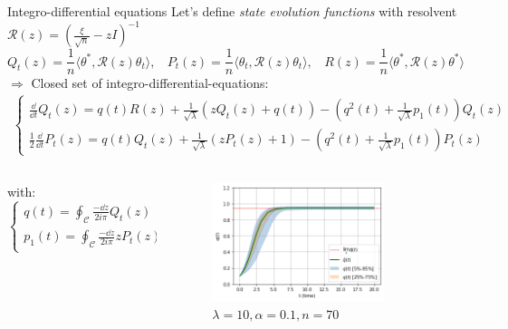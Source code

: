 \documentclass[10pt]{beamer}
\begin{document}
\begin{frame}{Integro-differential equations}
  Let's define \emph{state evolution functions} with resolvent $\mathcal R(z) = (\frac{\xi}{\sqrt n} - z I)^{-1}$
  $$Q_t(z) = \frac{1}{n} \langle \theta^*, \mathcal R(z) \theta_t \rangle, ~~~~ 
  P_t(z) = \frac{1}{n} \langle \theta_t, \mathcal R(z) \theta_t \rangle, ~~~~ 
  R(z) = \frac{1}{n} \langle \theta^*, \mathcal R(z) \theta^* \rangle$$
  $\Rightarrow$ Closed set of integro-differential-equations:
  \begin{align*}
      \begin{cases}
          \frac{\dd}{\dd t}Q_t(z) = q(t) R(z) 
                                     + \frac{1}{\sqrt \lambda} (z Q_t(z) + q(t))
                                      - \left(q^2(t) + \frac{1}{\sqrt \lambda} p_1(t) \right) Q_t(z) 
          \\
          \frac12 \frac{\dd}{\dd t} P_t(z) = q(t) Q_t(z) 
                                              + \frac{1}{\sqrt \lambda} (z P_t(z) + 1)
                                               - \left(q^2(t) + \frac{1}{\sqrt \lambda} p_1(t) \right) P_t(z)
      \end{cases}
  \end{align*}

  \begin{columns}
    \begin{column}{0.5\textwidth}
      with:
      \begin{equation*}
        \begin{cases}
          q(t) = \oint_{\mathcal C} \frac{-\dd z}{2i \pi} Q_t(z)\\
          p_1(t) = \oint_{\mathcal C} \frac{-\dd z}{2i \pi} z P_t(z) = \frac{1}{n} \theta_t^T \frac{\xi}{\sqrt n} \theta_t     
        \end{cases}
      \end{equation*}
    
    \end{column}
    \begin{column}{0.5\textwidth}
      \begin{figure}
        \centering
          \includegraphics[width=0.8\textwidth]{images/run_1.png}
        \caption{$\lambda = 10, \alpha = 0.1, n=70$}
    \end{figure}
    \end{column}
  \end{columns}
\end{frame}
\end{document}
